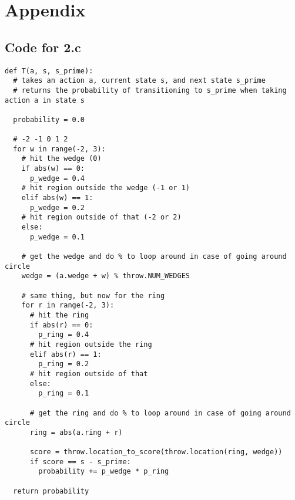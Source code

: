 \documentclass{article}
\begin{document}
\section*{Appendix}
\subsection*{Code for 2.c}
\begin{verbatim}
def T(a, s, s_prime):
  # takes an action a, current state s, and next state s_prime
  # returns the probability of transitioning to s_prime when taking action a in state s
  
  probability = 0.0

  # -2 -1 0 1 2
  for w in range(-2, 3):
    # hit the wedge (0)
    if abs(w) == 0:
      p_wedge = 0.4
    # hit region outside the wedge (-1 or 1)
    elif abs(w) == 1:
      p_wedge = 0.2
    # hit region outside of that (-2 or 2)
    else:
      p_wedge = 0.1

    # get the wedge and do % to loop around in case of going around circle
    wedge = (a.wedge + w) % throw.NUM_WEDGES

    # same thing, but now for the ring
    for r in range(-2, 3):
      # hit the ring
      if abs(r) == 0:
        p_ring = 0.4
      # hit region outside the ring
      elif abs(r) == 1:
        p_ring = 0.2
      # hit region outside of that
      else:
        p_ring = 0.1

      # get the ring and do % to loop around in case of going around circle
      ring = abs(a.ring + r)

      score = throw.location_to_score(throw.location(ring, wedge))
      if score == s - s_prime:
        probability += p_wedge * p_ring

  return probability
\end{verbatim}
\end{document}
